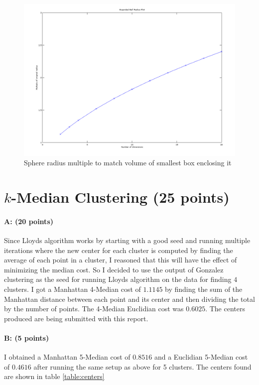 \documentclass[11pt]{article}
\begin{document}
\begin{figure}[!htb]
\centering
\includegraphics[width=5in]{figures/3cplot.png}
\caption{Sphere radius multiple to match volume of smallest box enclosing it}
\label{cplot}
\end{figure}

\section{$k$-Median Clustering (25 points)}

\paragraph{A: (20 points)} 
Since Lloyds algorithm works by starting with a good seed and running multiple iterations where the new center for each cluster is computed by finding the average of each point in a cluster, I reasoned that this will have the effect of minimizing the median cost. So I decided to use the output of Gonzalez clustering as the seed for running Lloyds algorithm on the data for finding $4$ clusters. I got a Manhattan 4-Median cost of $1.1145$ by finding the sum of the Manhattan distance between each point and its center and then dividing the total by the number of points. The 4-Median Euclidian cost was $0.6025$. The centers produced are being submitted with this report.

\paragraph{B: (5 points)}
I obtained a Manhattan 5-Median cost of $0.8516$ and a Euclidian 5-Median cost of $0.4616$ after running the same setup as above for 5 clusters. The centers found are shown in table \ref{table:centers}
\end{document}
